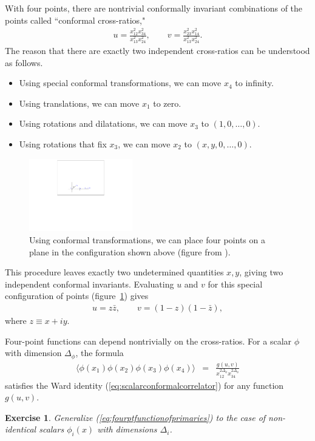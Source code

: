 \documentclass{ws-rv9x6}
\newcommand\be{\begin{eqnarray}}
\newcommand\ee{\end{eqnarray}}
\newcommand\f\phi
\newcommand\<\langle
\renewcommand\>\rangle
\renewcommand\.{\cdot}
\newcommand\De{\Delta}
\newtheorem{exercise}{Exercise}[section]
\begin{document}
With four points, there are nontrivial conformally invariant combinations of the points called ``conformal cross-ratios,"
\be
\label{eq:definitionofcrossratios}
u = \frac{x_{12}^2 x_{34}^2}{x_{13}^2 x_{24}^2},\qquad
v = \frac{x_{23}^2 x_{14}^2}{x_{13}^2 x_{24}^2}.
\ee
The reason that there are exactly two independent cross-ratios can be understood as follows.
\begin{itemize}
\item Using special conformal transformations, we can move $x_4$ to infinity.
\item Using translations, we can move $x_1$ to zero.
\item Using rotations and dilatations, we can move $x_3$ to $(1,0,\dots,0)$.
\item Using rotations that fix $x_3$, we can move $x_2$ to $(x,y,0,\dots,0)$.
\end{itemize}

\begin{figure}
\begin{center}
\includegraphics[width=0.4\textwidth]{fig-z}
\end{center}
\caption{\label{fig:zplane} Using conformal transformations, we can place four points on a plane in the configuration shown above (figure from \cite{Hogervorst:2013sma}).}
\end{figure}

This procedure leaves exactly two undetermined quantities $x,y$, giving two independent conformal invariants. Evaluating $u$ and $v$ for this special configuration of points (figure~\ref{fig:zplane}) gives
\be
u=z\bar z,\qquad v=(1-z)(1-\bar z),
\ee
where $z\equiv x+iy$.

Four-point functions can depend nontrivially on the cross-ratios.  For a scalar $\f$ with dimension $\De_\phi$, the formula
\be
\label{eq:fourptfunctionofprimaries}
\<\f(x_1)\f(x_2)\f(x_3)\f(x_4)\> &=& \frac{g(u,v)}{x_{12}^{2\De_\f}x_{34}^{2\De_\f}}
\ee
satisfies the Ward identity (\ref{eq:scalarconformalcorrelator}) for any function $g(u,v)$. 
\begin{exercise}
Generalize (\ref{eq:fourptfunctionofprimaries}) to the case of non-identical scalars $\f_i(x)$ with dimensions $\De_i$.
\end{exercise}
\end{document}
